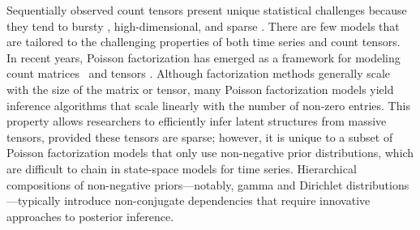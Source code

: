 \documentclass{article}
\begin{document}
%
Sequentially observed count tensors present unique statistical challenges because they tend to bursty \cite{kleinberg2003bursty}, high-dimensional, and sparse \cite{chi2012tensors,kunihama2013bayesian}. There are few models that are tailored to the challenging properties of both time series and count tensors.~
In recent years, Poisson factorization has emerged as a framework for modeling count matrices~\cite{canny2004gap,Dunson2005bayesianlatent,titsias2008infinite,cemgil2009bayesian,zhou2011beta,gopalan2013efficient} and tensors \cite{chi2012tensors,ermis2014bayesian,schein2015bayesian}. Although factorization methods generally scale with the size of the matrix or tensor, many Poisson factorization models yield inference algorithms that scale linearly with the number of non-zero entries. This property allows researchers to efficiently infer latent structures from massive tensors, provided these tensors are sparse; however, it is unique to a subset of Poisson factorization models that only use non-negative prior distributions, which are difficult to chain in state-space models for time series. Hierarchical compositions of non-negative priors---notably, gamma and Dirichlet distributions---typically introduce non-conjugate dependencies that require innovative approaches to posterior inference.

\end{document}
